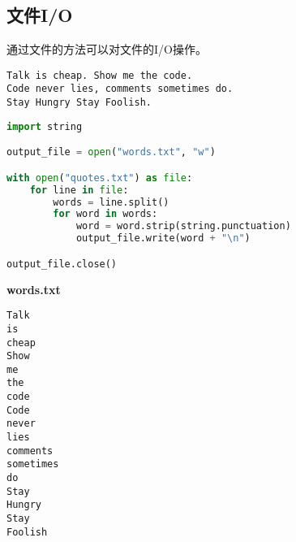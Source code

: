 \subsection{文件I/O}

通过文件的方法可以对文件的I/O操作。\\

\begin{table}[H]
    \centering
    \caption{文件I/O}
\end{table}

\vspace{0.5cm}


\begin{lstlisting}[title=quotes.txt]
Talk is cheap. Show me the code.
Code never lies, comments sometimes do.
Stay Hungry Stay Foolish.
\end{lstlisting}

\begin{lstlisting}[language=Python]
import string

output_file = open("words.txt", "w")

with open("quotes.txt") as file:
    for line in file:
        words = line.split()
        for word in words:
            word = word.strip(string.punctuation)
            output_file.write(word + "\n")

output_file.close()
\end{lstlisting}

\begin{tcolorbox}
    \textbf{words.txt}
    \begin{verbatim}
Talk
is
cheap
Show
me
the
code
Code
never
lies
comments
sometimes
do
Stay
Hungry
Stay
Foolish
	\end{verbatim}
\end{tcolorbox}

